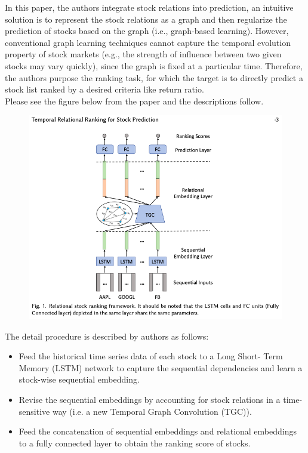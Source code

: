 \documentclass[11pt, oneside]{article}   	%
\begin{document}
\begin{Large}
In this paper, the authors integrate stock relations into prediction, an intuitive solution is to represent the stock relations as a graph and then regularize the prediction of stocks based on the graph (i.e., graph-based learning). However, conventional graph learning techniques cannot capture the temporal evolution property of stock markets (e.g., the strength of influence between two given stocks may vary quickly), since the graph is fixed at a particular time.  Therefore, the authors purpose the ranking task, for which the target is to directly predict a stock list ranked by a desired criteria like return ratio.\\
Please see the figure below from the paper and the descriptions follow. \\
\begin{figure}[h] %
   \centering
   \includegraphics[width=6in]{temporalFig1} 
\end{figure}

The detail procedure is described by authors as follows:

\begin{itemize}
\item Feed the historical time series data of each stock to a Long Short- Term Memory (LSTM) network to capture the sequential dependencies and learn a stock-wise sequential embedding. 
\item Revise the sequential embeddings by accounting for stock relations in a time-sensitive way (i.e. a new Temporal Graph Convolution (TGC)).
\item Feed the concatenation of sequential embeddings and relational embeddings to a fully connected layer to obtain the ranking score of stocks. 
\end{itemize}




\end{Large}
\end{document}
